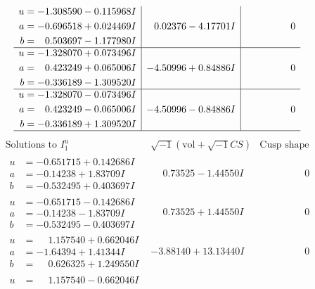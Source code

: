 \documentclass[1p]{elsarticle_modified}
\theoremstyle{definition}
\newcommand{\I}{\sqrt{-1}}
\begin{document}
$$\begin{array}{c|c|c}
\begin{aligned}
u &= -1.308590 - 0.115968 I \\
a &= -0.696518 + 0.024469 I \\
b &= \phantom{-}0.503697 - 1.177980 I\end{aligned}
 & \phantom{-}0.02376 - 4.17701 I & \phantom{-0.000000 } 0 \\ \hline\begin{aligned}
u &= -1.328070 + 0.073496 I \\
a &= \phantom{-}0.423249 + 0.065006 I \\
b &= -0.336189 - 1.309520 I\end{aligned}
 & -4.50996 + 0.84886 I & \phantom{-0.000000 } 0 \\ \hline\begin{aligned}
u &= -1.328070 - 0.073496 I \\
a &= \phantom{-}0.423249 - 0.065006 I \\
b &= -0.336189 + 1.309520 I\end{aligned}
 & -4.50996 - 0.84886 I & \phantom{-0.000000 } 0\\
 \hline 
 \end{array}$$\newpage$$\begin{array}{c|c|c}  
\text{Solutions to }I^u_{1}& \I (\text{vol} + \sqrt{-1}CS) & \text{Cusp shape}\\
 \hline 
\begin{aligned}
u &= -0.651715 + 0.142686 I \\
a &= -0.14238 + 1.83709 I \\
b &= -0.532495 + 0.403697 I\end{aligned}
 & \phantom{-}0.73525 - 1.44550 I & \phantom{-0.000000 } 0 \\ \hline\begin{aligned}
u &= -0.651715 - 0.142686 I \\
a &= -0.14238 - 1.83709 I \\
b &= -0.532495 - 0.403697 I\end{aligned}
 & \phantom{-}0.73525 + 1.44550 I & \phantom{-0.000000 } 0 \\ \hline\begin{aligned}
u &= \phantom{-}1.157540 + 0.662046 I \\
a &= -1.64394 + 1.41344 I \\
b &= \phantom{-}0.626325 + 1.249550 I\end{aligned}
 & -3.88140 + 13.13440 I & \phantom{-0.000000 } 0 \\ \hline\begin{aligned}
u &= \phantom{-}1.157540 - 0.662046 I \\

\end{aligned}
\end{array}$$
\end{document}
